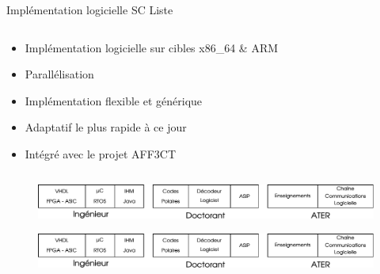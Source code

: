 \documentclass[t,compress,mathserif,12pt,xcolor=dvipsnames]{beamer}
\begin{document}
\begin{frame}[t]{Implémentation logicielle SC Liste}
  \begin{minipage}[t][5.0cm][t]{\textwidth}
    \begin{columns}
      \begin{column}{0.63\textwidth}
        \vspace{-30pt}
        \begin{itemize}
          \item Implémentation logicielle sur cibles x86\_64 \& ARM
          \item Parallélisation
          \item Implémentation flexible et générique
          \item Adaptatif le plus rapide à ce jour
          \item Intégré avec le projet AFF3CT
        \end{itemize}
      \end{column}
      \begin{column}{0.04\textwidth}

      \end{column}
      \begin{column}{0.33\textwidth}
      \end{column}
    \end{columns}
  \end{minipage}
    \begin{figure}[htp]
    \centering
    \includegraphics[width=\textwidth]{fig/frise}
  \end{figure}\begin{figure}[htp]
    \centering
    \includegraphics[width=\textwidth]{fig/frise}
  \end{figure}
\end{frame}
\end{document}
